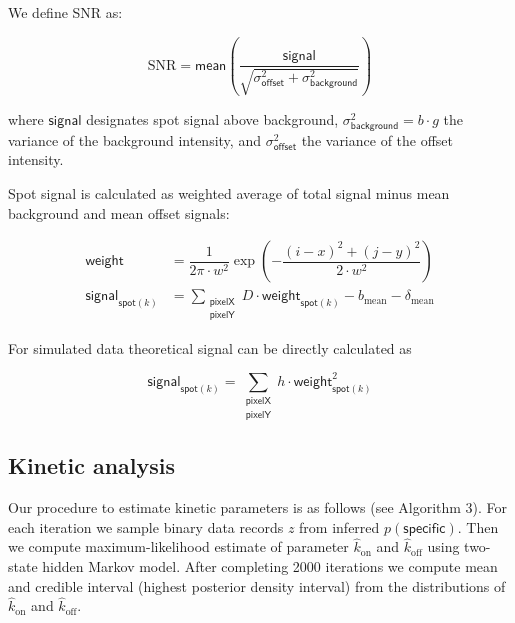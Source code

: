 We define SNR as:

\begin{equation}
    \mathrm{SNR} = \mathsf{mean} \left( \dfrac{\mathsf{signal}}{\sqrt{\sigma^2_{\mathsf{offset}} + \sigma^2_{\mathsf{background}}}} \right)
\end{equation}

where $\mathsf{signal}$ designates spot signal above background, $\sigma^2_{\mathsf{background}} = b \cdot g$ the variance of the background intensity, and $\sigma^2_{\mathsf{offset}}$ the variance of the offset intensity.

Spot signal is calculated as weighted average of total signal minus mean background and mean offset signals:

\begin{subequations}
\begin{align}
    \mathsf{weight} &= \dfrac{1}{2 \pi \cdot w^2} \exp{\left( -\dfrac{(i-x)^2 + (j-y)^2}{2 \cdot w^2} \right)} \\
    \mathsf{signal}_{\mathsf{spot}(k)} &=  \sum_{\substack{\mathsf{pixelX} \\ \mathsf{pixelY}}} D \cdot \mathsf{weight}_{\mathsf{spot}(k)} - b_{\mathrm{mean}} - \delta_\mathrm{mean}
\end{align}
\end{subequations}

For simulated data theoretical signal can be directly calculated as

\begin{equation}
    \mathsf{signal}_{\mathsf{spot}(k)} =  \sum_{\substack{\mathsf{pixelX} \\ \mathsf{pixelY}}} h \cdot \mathsf{weight}_{\mathsf{spot}(k)}^2
\end{equation}

\subsection*{Kinetic analysis}

Our procedure to estimate kinetic parameters is as follows (see Algorithm 3). For each iteration we sample binary data records $z$ from inferred $p(\mathsf{specific})$. Then we compute maximum-likelihood estimate of parameter $\hat{k}_\mathrm{on}$ and $\hat{k}_\mathrm{off}$ using two-state hidden Markov model. After completing 2000 iterations we compute mean and credible interval (highest posterior density interval) from the distributions of $\hat{k}_\mathrm{on}$ and $\hat{k}_\mathrm{off}$.

